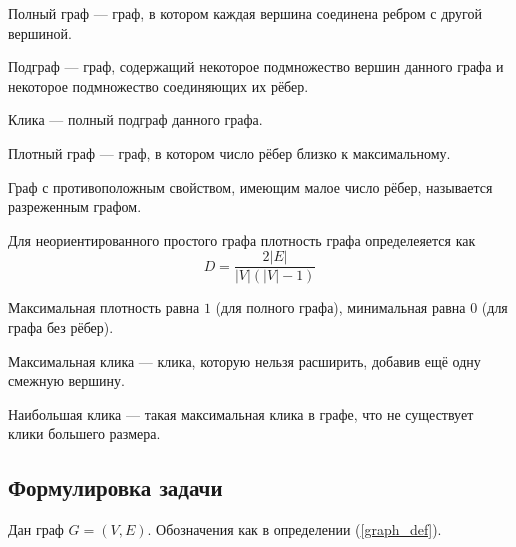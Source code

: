     \begin{definition}
    \label{full_graph_def}
      Полный граф --- граф, в котором каждая вершина соединена ребром с другой
      вершиной.
    \end{definition}

    \begin{definition}
    \label{subgraph_def}
      Подграф --- граф, содержащий некоторое подмножество вершин данного графа и 
      некоторое подмножество соединяющих их рёбер.
    \end{definition}

    \begin{definition}
    \label{clique_def}
      Клика --- полный подграф данного графа.
    \end{definition}

    \begin{definition}
    \label{dense_graph_def}
      Плотный граф --- граф, в котором число рёбер близко к максимальному.

      Граф с противоположным свойством, имеющим малое число рёбер, называется
      разреженным графом.
    \end{definition}

    \begin{definition}
    \label{density_def}
      Для неориентированного простого графа плотность графа \cite{coleman1983estimation}
      определеяется как
      \begin{equation}
        D = \frac{2|E|}{|V|\left(|V| - 1\right)}
      \end{equation}

      Максимальная плотность равна $1$ (для полного графа), минимальная равна $0$
      (для графа без рёбер).
    \end{definition}

    \begin{definition}
    \label{maximal_clique_def}
      Максимальная клика --- клика, которую нельзя расширить, добавив ещё одну
      смежную вершину.
    \end{definition}

    \begin{definition}
    \label{maximum_clique_def}
      Наибольшая клика --- такая максимальная клика в графе, что не существует
      клики большего размера.
    \end{definition}
  \subsection{Формулировка задачи}
    Дан граф $G = \left(V, E\right)$. Обозначения как в определении (\ref{graph_def}).

